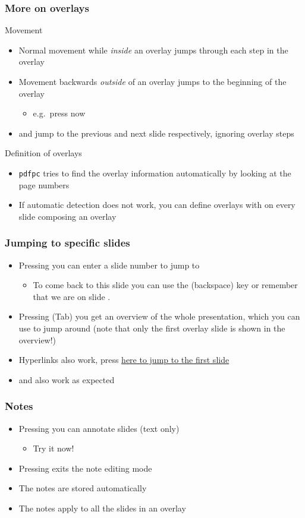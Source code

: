 \documentclass{beamer}
\newcommand{\singleitem}[1]{\begin{itemize}\item #1\end{itemize}}
\newcommand{\pdfpc}{\texttt{pdfpc}\xspace}
\begin{document}
\begin{frame}
  \frametitle{More on overlays}
  \begin{block}{Movement}
    \begin{itemize}
      \item Normal movement while \emph{inside} an overlay jumps through each step
        in the overlay
      \item Movement backwards \emph{outside} of an overlay jumps to the beginning
        of the overlay
        \singleitem{e.g.\ press \PgUp now}
      \item \UArrow and \DArrow jump to the previous and next slide respectively,
        ignoring overlay steps
    \end{itemize}
  \end{block}
  \begin{block}{Definition of overlays}
    \begin{itemize}
      \item \pdfpc tries to find the overlay information automatically by
        looking at the page numbers
      \item If automatic detection does not work, you can define overlays with
         on every slide composing an overlay
    \end{itemize}
  \end{block}
\end{frame}

\begin{frame}
  \frametitle{Jumping to specific slides}
  \begin{itemize}
    \item Pressing  you can enter a slide number to jump to
      \singleitem{To come back to this slide you can use the \BSpace (backspace) key or remember that we are on slide \insertframenumber.}
    \item Pressing \Tab (Tab) you get an overview of the whole presentation,
      which you can use to jump around (note that only the first overlay slide
      is shown in the overview!)
    \item Hyperlinks also work, press \hyperlink{titlePage}{here to jump to the
      first slide}
    \item \Home and \End also work as expected
  \end{itemize}
\end{frame}

\begin{frame}
  \frametitle{Notes}
  \begin{itemize}
    \item Pressing  you can annotate slides (text only)
      \singleitem{Try it now!}
    \item Pressing \Esc exits the note editing mode
    \item The notes are stored automatically
    \item The notes apply to all the slides in an overlay
  \end{itemize}
\end{frame}
\end{document}
